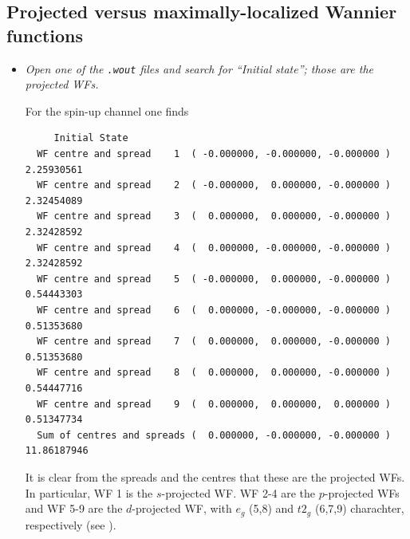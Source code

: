 \subsection*{Projected versus maximally-localized Wannier functions}
\begin{itemize}
	\item {\it Open one of the {\tt .wout} files and search for ``Initial state''; those are the projected WFs.} 
	
	For the spin-up channel one finds
	  \begin{tcolorbox}[sharp corners,boxrule=0.5pt]
  {\small
	\begin{verbatim}
	 Initial State
  WF centre and spread    1  ( -0.000000, -0.000000, -0.000000 )     2.25930561
  WF centre and spread    2  ( -0.000000,  0.000000, -0.000000 )     2.32454089 
  WF centre and spread    3  (  0.000000,  0.000000, -0.000000 )     2.32428592 
  WF centre and spread    4  (  0.000000, -0.000000, -0.000000 )     2.32428592 
  WF centre and spread    5  ( -0.000000,  0.000000, -0.000000 )     0.54443303
  WF centre and spread    6  (  0.000000, -0.000000, -0.000000 )     0.51353680
  WF centre and spread    7  (  0.000000,  0.000000, -0.000000 )     0.51353680
  WF centre and spread    8  (  0.000000,  0.000000, -0.000000 )     0.54447716
  WF centre and spread    9  (  0.000000,  0.000000,  0.000000 )     0.51347734 
  Sum of centres and spreads (  0.000000, -0.000000, -0.000000 )    11.86187946
	\end{verbatim}
	}
	\end{tcolorbox}
	It is clear from the spreads and the centres that these are the projected WFs. In particular, WF 1 is the $s$-projected WF. WF 2-4 are the $p$-projected WFs and WF 5-9 are the $d$-projected WF, with $e_g$ (5,8) and $t2_g$ (6,7,9) charachter, respectively (see ). 
	\begin{figure}[h!]
	\centering

\end{figure}
\end{itemize}
